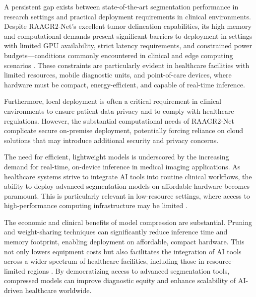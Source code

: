 \documentclass[12pt,a4paper]{article}
\begin{document}
A persistent gap exists between state-of-the-art segmentation performance in research settings and practical deployment requirements in clinical environments. Despite RAAGR2-Net's excellent tumor delineation capabilities, its high memory and computational demands present significant barriers to deployment in settings with limited GPU availability, strict latency requirements, and constrained power budgets—conditions commonly encountered in clinical and edge computing scenarios \cite{Yang2025, Mazurek2024}. These constraints are particularly evident in healthcare facilities with limited resources, mobile diagnostic units, and point-of-care devices, where hardware must be compact, energy-efficient, and capable of real-time inference.

Furthermore, local deployment is often a critical requirement in clinical environments to ensure patient data privacy and to comply with healthcare regulations. However, the substantial computational needs of RAAGR2-Net complicate secure on-premise deployment, potentially forcing reliance on cloud solutions that may introduce additional security and privacy concerns.

The need for efficient, lightweight models is underscored by the increasing demand for real-time, on-device inference in medical imaging applications. As healthcare systems strive to integrate AI tools into routine clinical workflows, the ability to deploy advanced segmentation models on affordable hardware becomes paramount. This is particularly relevant in low-resource settings, where access to high-performance computing infrastructure may be limited \cite{Yang2025, Mazurek2024}.

The economic and clinical benefits of model compression are substantial. Pruning and weight-sharing techniques can significantly reduce inference time and memory footprint, enabling deployment on affordable, compact hardware. This not only lowers equipment costs but also facilitates the integration of AI tools across a wider spectrum of healthcare facilities, including those in resource-limited regions \cite{Wu2023, Ragab2024}. By democratizing access to advanced segmentation tools, compressed models can improve diagnostic equity and enhance scalability of AI-driven healthcare worldwide.
\end{document}
